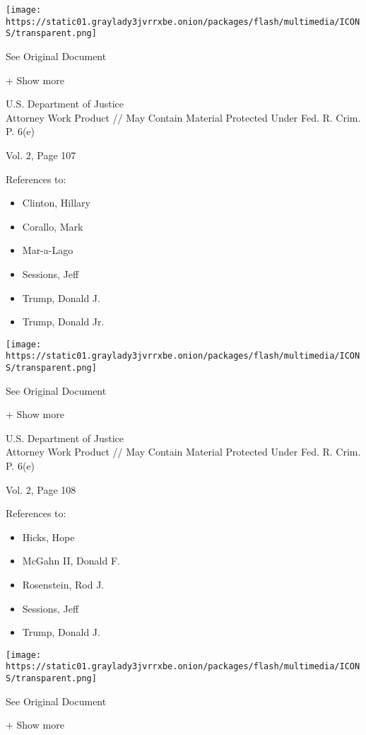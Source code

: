 \protect\hyperlink{}{}

\texttt{[image: https://static01.graylady3jvrrxbe.onion/packages/flash/multimedia/ICONS/transparent.png]}

See Original Document

+ Show more

U.S. Department of Justice\\
Attorney Work Product // May Contain Material Protected Under Fed. R.
Crim. P. 6(e)

Vol. 2, Page 107

References to:

\begin{itemize}
\tightlist
\item
  Clinton, Hillary
\item
  Corallo, Mark
\item
  Mar-a-Lago
\item
  Sessions, Jeff
\item
  Trump, Donald J.
\item
  Trump, Donald Jr.
\end{itemize}

\protect\hyperlink{}{}

\texttt{[image: https://static01.graylady3jvrrxbe.onion/packages/flash/multimedia/ICONS/transparent.png]}

See Original Document

+ Show more

U.S. Department of Justice\\
Attorney Work Product // May Contain Material Protected Under Fed. R.
Crim. P. 6(e)

Vol. 2, Page 108

References to:

\begin{itemize}
\tightlist
\item
  Hicks, Hope
\item
  McGahn II, Donald F.
\item
  Rosenstein, Rod J.
\item
  Sessions, Jeff
\item
  Trump, Donald J.
\end{itemize}

\protect\hyperlink{}{}

\texttt{[image: https://static01.graylady3jvrrxbe.onion/packages/flash/multimedia/ICONS/transparent.png]}

See Original Document

+ Show more

